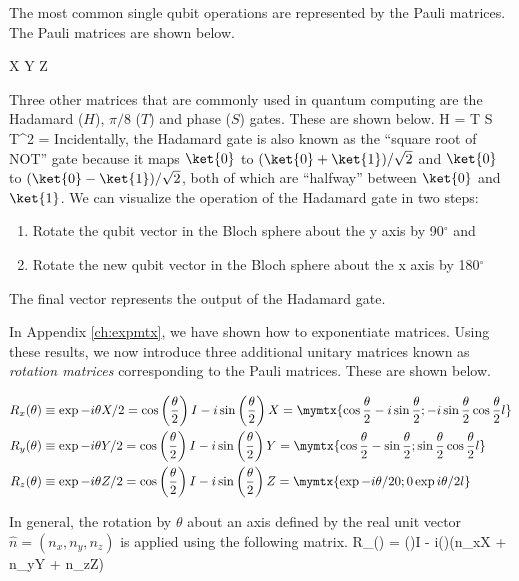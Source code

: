 The most common single qubit operations are represented by the Pauli matrices.  The Pauli matrices are shown below. 

\beq
X \equiv {} \text{ ; } Y \equiv {} \text{ ; } Z \equiv {}
\eeq

Three other matrices that are commonly used in quantum computing are the Hadamard ($H$), $\pi/8$ ($T$) and phase ($S$) gates. These are shown below.
\beq
H \equiv {} =  \text{ ; } T \equiv {} \text{ ; } S \equiv T^2 = 
\eeq
Incidentally, the Hadamard gate is also known as the ``square root of NOT'' gate because it maps $\ket{0}$ to $(\ket{0} + \ket{1})/\sqrt{2}$ and $\ket{0}$ to $(\ket{0} - \ket{1})/\sqrt{2}$, both of which are ``halfway'' between $\ket{0}$ and $\ket{1}$. We can visualize the operation of the Hadamard gate in two steps: 
\begin{enumerate}
\item Rotate the qubit vector in the Bloch sphere about the y axis by 90$^{\circ}$ and
\item Rotate the new qubit vector in the Bloch sphere about the x axis by 180$^{\circ}$
\end{enumerate}
The final vector represents the output of the Hadamard gate.

In Appendix \ref{ch:expmtx}, we have shown how to exponentiate matrices. Using these results, we now introduce three additional unitary matrices known as \textit{rotation matrices} corresponding to the Pauli matrices. These are shown below.

\begin{align}
R_x(\theta) &\equiv \exp{-i\theta X/2} = \cos\left(\frac{\theta}{2}\right)I - i\sin\left(\frac{\theta}{2}\right)X = 
\mymtx{\cos\frac{\theta}{2} -i\sin\frac{\theta}{2} ; -i\sin\frac{\theta}{2} \cos\frac{\theta}{2}l}\\ 
R_y(\theta) &\equiv \exp{-i\theta Y/2} = \cos\left(\frac{\theta}{2}\right)I - i\sin\left(\frac{\theta}{2}\right)Y = 
\mymtx{\cos\frac{\theta}{2} -\sin\frac{\theta}{2} ; \sin\frac{\theta}{2} \cos\frac{\theta}{2}l}\\ 
R_z(\theta) &\equiv \exp{-i\theta Z/2} = \cos\left(\frac{\theta}{2}\right)I - i\sin\left(\frac{\theta}{2}\right)Z = 
\mymtx{\exp{-i\theta/2} 0 ; 0 \exp{i\theta/2}l}
\end{align}

In general, the rotation by $\theta$ about an axis defined by the real unit vector $\hat{n} = (n_x,n_y,n_z)$ is applied using the following matrix.
\beq
R_{}(\theta) \equiv {} = \cos\left(\right)I - i\sin\left(\right)(n_xX + n_yY + n_zZ)
\eeq

